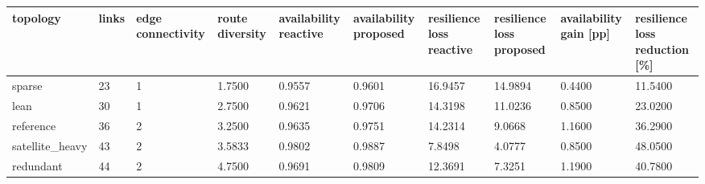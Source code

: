 \begin{tabular}{llllllllll}
\toprule
topology & links & edge connectivity & route diversity & availability reactive & availability proposed & resilience loss reactive & resilience loss proposed & availability gain [pp] & resilience loss reduction [\%] \\
\midrule
sparse & 23 & 1 & 1.7500 & 0.9557 & 0.9601 & 16.9457 & 14.9894 & 0.4400 & 11.5400 \\
lean & 30 & 1 & 2.7500 & 0.9621 & 0.9706 & 14.3198 & 11.0236 & 0.8500 & 23.0200 \\
reference & 36 & 2 & 3.2500 & 0.9635 & 0.9751 & 14.2314 & 9.0668 & 1.1600 & 36.2900 \\
satellite\_heavy & 43 & 2 & 3.5833 & 0.9802 & 0.9887 & 7.8498 & 4.0777 & 0.8500 & 48.0500 \\
redundant & 44 & 2 & 4.7500 & 0.9691 & 0.9809 & 12.3691 & 7.3251 & 1.1900 & 40.7800 \\
\bottomrule
\end{tabular}
